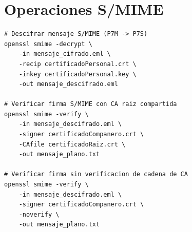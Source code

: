 \documentclass[12pt,a4paper]{report}
\begin{document}
\section{Operaciones S/MIME}

\begin{lstlisting}[caption=Comandos S/MIME para descifrado y verificación]
# Descifrar mensaje S/MIME (P7M -> P7S)
openssl smime -decrypt \
    -in mensaje_cifrado.eml \
    -recip certificadoPersonal.crt \
    -inkey certificadoPersonal.key \
    -out mensaje_descifrado.eml

# Verificar firma S/MIME con CA raiz compartida
openssl smime -verify \
    -in mensaje_descifrado.eml \
    -signer certificadoCompanero.crt \
    -CAfile certificadoRaiz.crt \
    -out mensaje_plano.txt

# Verificar firma sin verificacion de cadena de CA
openssl smime -verify \
    -in mensaje_descifrado.eml \
    -signer certificadoCompanero.crt \
    -noverify \
    -out mensaje_plano.txt
\end{lstlisting}
\end{document}
